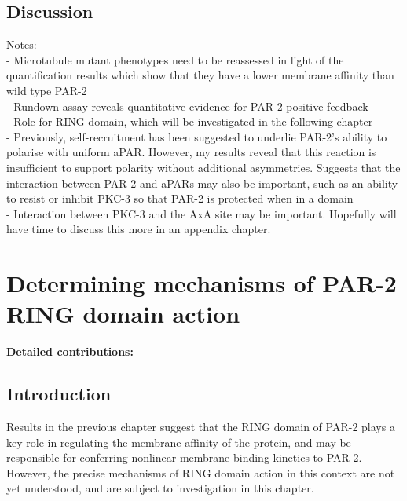 \documentclass[12pt]{"report"}
\begin{document}

\section{Discussion}

Notes:\\
- Microtubule mutant phenotypes need to be reassessed in light of the quantification results which show that they have a lower membrane affinity than wild type PAR-2\\
- Rundown assay reveals quantitative evidence for PAR-2 positive feedback\\
- Role for RING domain, which will be investigated in the following chapter\\
- Previously, self-recruitment has been suggested to underlie PAR-2's ability to polarise with uniform aPAR. However, my results reveal that this reaction is insufficient to support polarity without additional asymmetries. Suggests that the interaction between PAR-2 and aPARs may also be important, such as an ability to resist or inhibit PKC-3 so that PAR-2 is protected when in a domain\\
- Interaction between PKC-3 and the AxA site may be important. Hopefully will have time to discuss this more in an appendix chapter.\\


\clearpage
\chapter{Determining mechanisms of PAR-2 RING domain action}

\textbf{Detailed contributions:}\\

\clearpage
\section{Introduction}

Results in the previous chapter suggest that the RING domain of PAR-2 plays a key role in regulating the membrane affinity of the protein, and may be responsible for conferring nonlinear-membrane binding kinetics to PAR-2. However, the precise mechanisms of RING domain action in this context are not yet understood, and are subject to investigation in this chapter.\\
\end{document}
